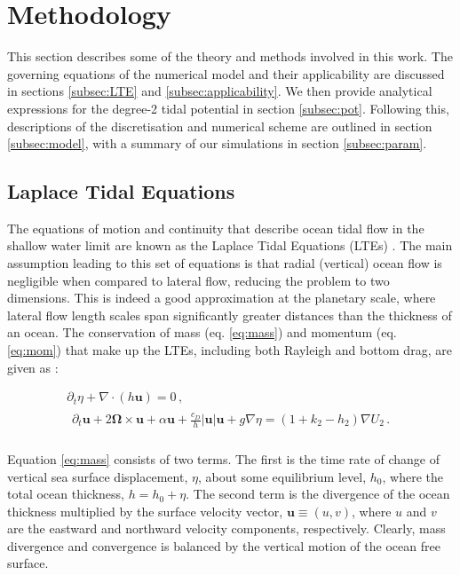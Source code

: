 \section{Methodology}\label{sec:method}

This section describes some of the theory and methods involved in this work. The governing equations of the numerical model and their applicability are discussed in sections \ref{subsec:LTE} and \ref{subsec:applicability}. We then provide analytical expressions for the degree-2 tidal potential in section \ref{subsec:pot}. Following this, descriptions of the discretisation and numerical scheme are outlined in section \ref{subsec:model}, with a summary of our simulations in section \ref{subsec:param}.

\subsection{Laplace Tidal Equations \label{subsec:LTE}}

The equations of motion and continuity that describe ocean tidal flow in the shallow water limit are known as the Laplace Tidal Equations (LTEs) \citep{lamb1932hydrodynamics}. The main assumption leading to this set of equations is that radial (vertical) ocean flow is negligible when compared to lateral flow, reducing the problem to two dimensions. This is indeed a good approximation at the planetary scale, where lateral flow length scales span significantly greater distances than the thickness of an ocean. The conservation of mass (eq. \ref{eq:mass}) and momentum (eq. \ref{eq:mom}) that make up the LTEs, including both Rayleigh and bottom drag, are given as \citep{sears1995tidal,tyler2008strong,matsuyama2014tidal}:


\vspace{-0.5cm}
\begin{gather}
\partial_t \eta + \nabla \cdot \left(h \bm{u}\right) = 0\, , \label{eq:mass}\\
\begin{aligned} 
\partial_t \bm{u} + 2 \bm{\Omega} \times \bm{u} + \alpha\bm{u} + \frac{c_D}{h} \left|\bm{u}\right| \bm{u}  + g \nabla \eta = (1 + k_2 - h_2) \nabla U_2 \, . \label{eq:mom}\\
\end{aligned} 
\end{gather}

Equation \ref{eq:mass} consists of two terms. The first is the time rate of change of vertical sea surface displacement, $\eta$, about some equilibrium level, $h_0$, where the total ocean thickness, $h = h_0 + \eta$. The second term is the divergence of the ocean thickness multiplied by the surface velocity vector, $\bm{u} \equiv (u, v)$, where $u$ and $v$ are the eastward and northward velocity components, respectively. Clearly, mass divergence and convergence is balanced by the vertical motion of the ocean free surface.

